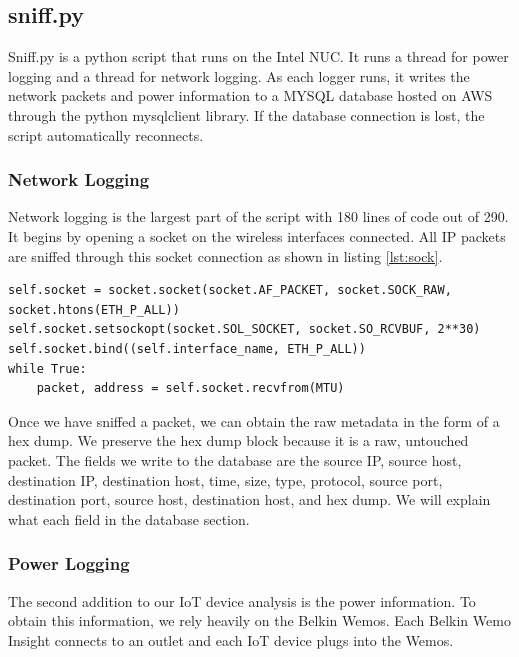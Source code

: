 \subsection{sniff.py}
\label{sniff.py}

Sniff.py is a python script that runs on the Intel NUC. It runs a thread for power logging and a thread for network logging. As each logger runs, it writes the network packets and power information to a MYSQL database hosted on AWS through the python mysqlclient library. If the database connection is lost, the script automatically reconnects.

\subsubsection{Network Logging}

Network logging is the largest part of the script with 180 lines of code out of 290. It begins by opening a socket on the wireless interfaces connected. All IP packets are sniffed through this socket connection as shown in listing \ref{lst:sock}.

\begin{lstlisting}[label={lst:sock},caption={Open and Read from a Socket},captionpos=b]
self.socket = socket.socket(socket.AF_PACKET, socket.SOCK_RAW, socket.htons(ETH_P_ALL))
self.socket.setsockopt(socket.SOL_SOCKET, socket.SO_RCVBUF, 2**30)
self.socket.bind((self.interface_name, ETH_P_ALL))
while True:
    packet, address = self.socket.recvfrom(MTU)
\end{lstlisting}

Once we have sniffed a packet, we can obtain the raw metadata in the form of a hex dump. We preserve the hex dump block because it is a raw, untouched packet. The fields we write to the database are the source IP, source host, destination IP, destination host, time, size, type, protocol, source port, destination port, source host, destination host, and hex dump. We will explain what each field in the database section.

\subsubsection{Power Logging}

The second addition to our IoT device analysis is the power information. To obtain this information, we rely heavily on the Belkin Wemos. Each Belkin Wemo Insight connects to an outlet and each IoT device plugs into the Wemos.

